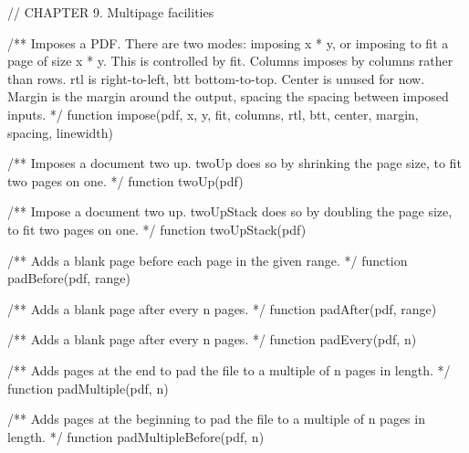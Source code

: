 // CHAPTER 9. Multipage facilities

/** Imposes a PDF. There are two modes: imposing x * y, or imposing to fit a
page of size x * y. This is controlled by fit. Columns imposes by columns
rather than rows. rtl is right-to-left, btt bottom-to-top. Center is unused
for now. Margin is the margin around the output, spacing the spacing between
imposed inputs. */
function impose(pdf, x, y, fit, columns, rtl, btt, center, margin, spacing, linewidth)

/** Imposes a document two up. twoUp does so by shrinking the page size, to fit
two pages on one. */
function twoUp(pdf)

/** Impose a document two up. twoUpStack does so by doubling the page size,
to fit two pages on one. */
function twoUpStack(pdf)

/** Adds a blank page before each page in the given range. */
function padBefore(pdf, range)

/** Adds a blank page after every n pages. */
function padAfter(pdf, range)

/** Adds a blank page after every n pages. */
function padEvery(pdf, n)

/** Adds pages at the end to pad the file to a multiple of n pages in
length. */
function padMultiple(pdf, n)

/** Adds pages at the beginning to pad the file to a multiple of n pages in
length. */
function padMultipleBefore(pdf, n)
